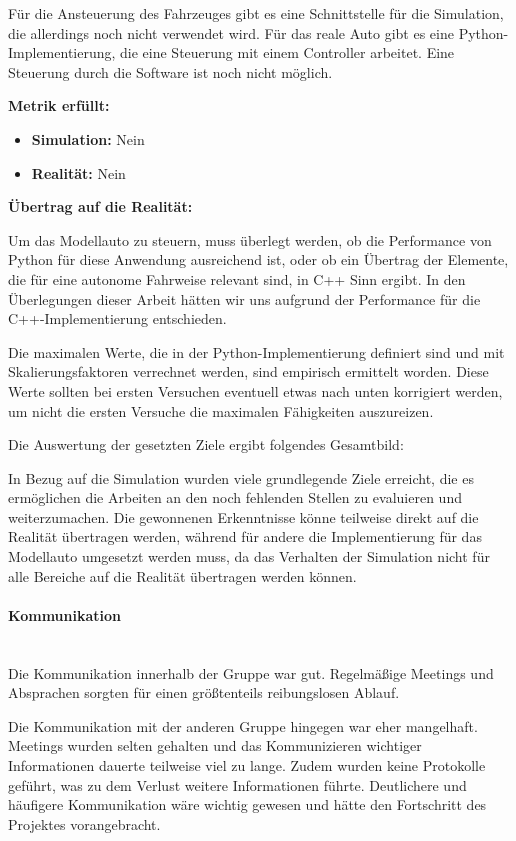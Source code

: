\begin{enumerate}[leftmargin=*]
    Für die Ansteuerung des Fahrzeuges gibt es eine Schnittstelle für die Simulation, die allerdings noch nicht verwendet wird.
    Für das reale Auto gibt es eine Python-Implementierung, die eine Steuerung mit einem Controller arbeitet. 
    Eine Steuerung durch die Software ist noch nicht möglich.

    \textbf{Metrik erfüllt:}
    \begin{itemize}
        \item \textbf{Simulation:} Nein
        \item \textbf{Realität:} Nein
    \end{itemize}
    
    \textbf{Übertrag auf die Realität:}

    Um das Modellauto zu steuern, muss überlegt werden, ob die Performance von Python für diese Anwendung ausreichend ist, 
    oder ob ein Übertrag der Elemente, die für eine autonome Fahrweise relevant sind, in C++ Sinn ergibt. 
    In den Überlegungen dieser Arbeit hätten wir uns aufgrund der Performance für die C++-Implementierung entschieden.

    Die maximalen Werte, die in der Python-Implementierung definiert sind und mit Skalierungsfaktoren verrechnet werden, 
    sind empirisch ermittelt worden. Diese Werte sollten bei ersten Versuchen eventuell etwas nach unten korrigiert werden,
    um nicht die ersten Versuche die maximalen Fähigkeiten auszureizen.
\end{enumerate}

Die Auswertung der gesetzten Ziele ergibt folgendes Gesamtbild:

In Bezug auf die Simulation wurden viele grundlegende Ziele erreicht, die es ermöglichen die Arbeiten an den noch fehlenden Stellen zu evaluieren 
und weiterzumachen.
Die gewonnenen Erkenntnisse könne teilweise direkt auf die Realität übertragen werden, während für andere die Implementierung für das Modellauto 
umgesetzt werden muss, da das Verhalten der Simulation nicht für alle Bereiche auf die Realität übertragen werden können.

\paragraph{Kommunikation} \mbox{}\\
Die Kommunikation innerhalb der Gruppe war gut.
Regelmäßige Meetings und Absprachen sorgten für einen größtenteils reibungslosen Ablauf.

Die Kommunikation mit der anderen Gruppe hingegen war eher mangelhaft.
Meetings wurden selten gehalten und das Kommunizieren wichtiger Informationen dauerte teilweise viel zu lange.
Zudem wurden keine Protokolle geführt, was zu dem Verlust weitere Informationen führte.
Deutlichere und häufigere Kommunikation wäre wichtig gewesen und hätte den Fortschritt des Projektes vorangebracht.


